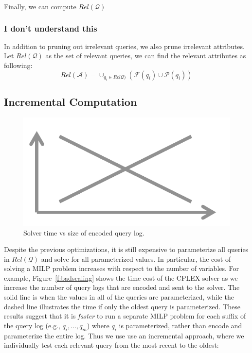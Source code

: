 Finally, we can compute $Rel\mathcal{(Q)}$



\subsubsection{I don't understand this}


In addition to pruning out irrelevant queries,
we also prune irrelevant attributes. \\
Let $Rel\mathcal{(Q)}$ as the set of 
relevant queries, we can find the relevant 
attributes as following:
\[Rel\mathcal{(A)} = \cup_{q_i \in Rel\mathcal{Q)}} 
(\mathcal{F}(q_i)\cup \mathcal{P}(q_i)) \]



\subsection{Incremental Computation}

\begin{figure}[t]
  \centering
  \includegraphics[width=.4\textwidth]{figures/placeholder}
  \caption{Solver time vs size of encoded query log.}
  \label{fig:badscaling}
\end{figure}


Despite the previous optimizations, it is still expensive to parameterize all 
queries in $Rel\mathcal{(Q)}$ and solve for all parameterized values.
In particular, the cost of solving a MILP problem increases 
with respect to the number of variables.
For example, Figure~\ref{f:badscaling} shows the time cost of the CPLEX solver
as we increase the number of query logs that are encoded and sent to the solver.  
The solid line is when the values in all of the queries are parameterized, while
the dashed line illustrates the time if only the oldest query is parameterized. 
These results suggest that it is {\it faster} to run a separate MILP problem for each 
suffix of the query log (e.g., $q_i, \ldots, q_m$) where $q_i$ is parameterized, 
rather than encode and parameterize the entire log.
Thus we use use an incremental approach, where we individually test each relevant query from the most recent
to the oldest:


